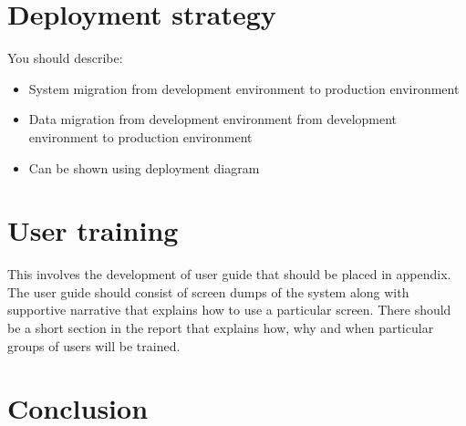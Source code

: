\section{Deployment strategy} %
\label{sec:deployment_strategy}
You should describe:
\begin{itemize}
   \item System migration from development environment to production environment
   \item Data migration from development environment from development environment to production environment
   \item Can be shown using deployment diagram
 \end{itemize}

\section{User training} %
\label{sec:user_training}

This involves the development of user guide that should be placed in appendix. The user guide should consist of screen dumps of the system along with supportive narrative that explains how to use a particular screen. There should be a short section in the report that explains how, why and when particular groups of users will be trained.

\section{Conclusion} %

